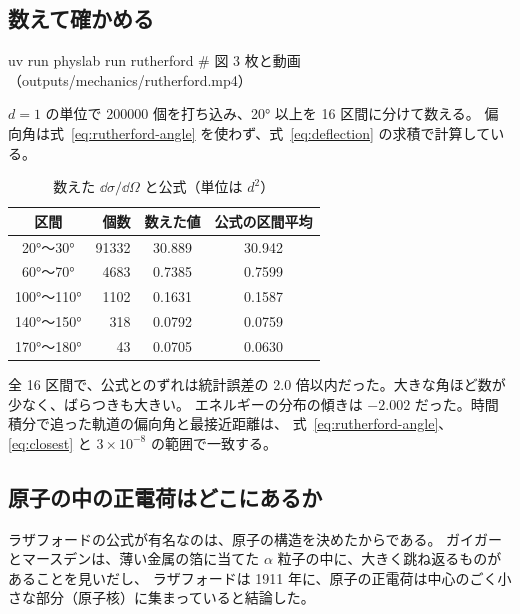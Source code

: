 \subsection{数えて確かめる}

\begin{simbox}
\begin{terminal}
uv run physlab run rutherford      # 図 3 枚と動画（outputs/mechanics/rutherford.mp4）
\end{terminal}
$d=1$ の単位で \num{200000} 個を打ち込み、\ang{20} 以上を 16 区間に分けて数える。
偏向角は式~\eqref{eq:rutherford-angle} を使わず、式~\eqref{eq:deflection} の求積で計算している。
\end{simbox}

\begin{table}[htbp]
\centering
\caption{数えた $\dd\sigma/\dd\Omega$ と公式（単位は $d^2$）}\label{tab:rutherford}
\begin{tabular}{crcc}
\toprule
区間 & 個数 & 数えた値 & 公式の区間平均 \\
\midrule
\ang{20}〜\ang{30}   & \num{91332} & 30.889 & 30.942 \\
\ang{60}〜\ang{70}   & \num{4683}  & 0.7385 & 0.7599 \\
\ang{100}〜\ang{110} & \num{1102}  & 0.1631 & 0.1587 \\
\ang{140}〜\ang{150} & 318         & 0.0792 & 0.0759 \\
\ang{170}〜\ang{180} & 43          & 0.0705 & 0.0630 \\
\bottomrule
\end{tabular}
\end{table}


全 16 区間で、公式とのずれは統計誤差の 2.0 倍以内だった。大きな角ほど数が少なく、ばらつきも大きい。
エネルギーの分布の傾きは $-2.002$ だった。時間積分で追った軌道の偏向角と最接近距離は、
式~\eqref{eq:rutherford-angle}、\eqref{eq:closest} と $3\times10^{-8}$ の範囲で一致する。

\subsection{原子の中の正電荷はどこにあるか}\label{sec:coll-nucleus}

ラザフォードの公式が有名なのは、原子の構造を決めたからである。
ガイガーとマースデンは、薄い金属の箔に当てた $\alpha$ 粒子の中に、大きく跳ね返るものがあることを見いだし、
ラザフォードは 1911 年に、原子の正電荷は中心のごく小さな部分（原子核）に集まっていると結論した。

